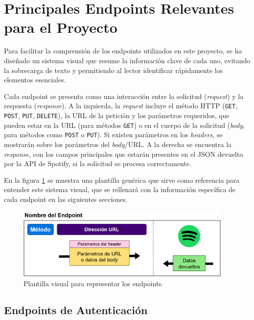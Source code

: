 \section{Principales Endpoints Relevantes para el Proyecto}

Para facilitar la comprensión de los endpoints utilizados en este proyecto, se ha diseñado un sistema visual que resume la información clave de cada uno, evitando la sobrecarga de texto y permitiendo al lector identificar rápidamente los elementos esenciales.

Cada endpoint se presenta como una interacción entre la solicitud (\textit{request}) y la respuesta (\textit{response}). A la izquierda, la \textit{request} incluye el método HTTP (\texttt{GET}, \texttt{POST}, \texttt{PUT}, \texttt{DELETE}), la URL de la petición y los parámetros requeridos, que pueden estar en la URL (para métodos \texttt{GET}) o en el cuerpo de la solicitud (\textit{body}, para métodos como \texttt{POST} o \texttt{PUT}). Si existen parámetros en los \textit{headers}, se mostrarán sobre los parámetros del \textit{body}/URL. A la derecha se encuentra la \textit{response}, con los campos principales que estarán presentes en el JSON devuelto por la API de Spotify, si la solicitud se procesa correctamente.

En la figura \ref{fig:plantilla_endpoints} se muestra una plantilla genérica que sirve como referencia para entender este sistema visual, que se rellenará con la información específica de cada endpoint en las siguientes secciones.

\begin{figure}[H]
    \centering
    \includegraphics[width=0.95\textwidth]{figures/endpoints/plantilla_endpoints.png}
    \caption{Plantilla visual para representar los endpoints.}
    \label{fig:plantilla_endpoints}
\end{figure}

\subsection{Endpoints de Autenticación}

